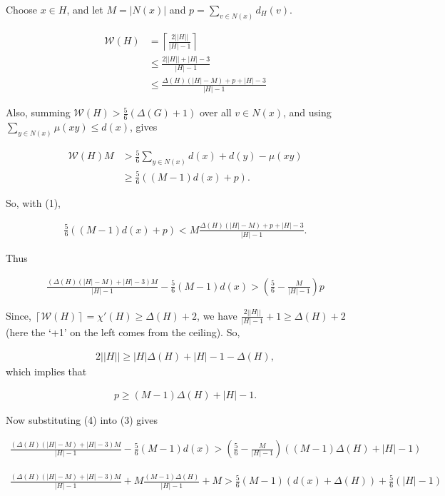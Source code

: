 \documentclass[12pt]{amsart}
\theoremstyle{plain}
\theoremstyle{definition}
\theoremstyle{remark}
\newcommand{\fancy}[1]{\mathcal{#1}}
\newcommand{\W}{\fancy{W}}
\newcommand{\ceil}[1]{\left\lceil#1\right\rceil}
\begin{document}
Choose $x \in H$, and let $M = |N(x)|$ and $p = \sum_{v \in N(x)} d_H(v)$.

\begin{align}
\W(H) & = \ceil{\frac{2||H||}{|H| - 1}} \\
& \le \frac{2||H|| + |H| - 3}{|H|-1}  \nonumber \\
& \le \frac{\Delta(H)(|H| - M) + p + |H| - 3}{|H|-1} \nonumber
\end{align}

Also, summing $\W(H) > \frac56(\Delta(G) + 1)$ over all $v \in N(x)$, and using
$\sum_{y\in N(x)}\mu(xy)\le d(x)$, gives

\begin{align}
\W(H)M & >  \frac56\sum_{y\in N(x)}d(x)+d(y)-\mu(xy) \nonumber \\
& \ge \frac56((M-1)d(x) + p).
\end{align}

So, with (1),

\begin{align*}
 \frac56((M-1)d(x) + p) <  M\frac{\Delta(H)(|H| - M) + p + |H| - 3}{|H|-1}.
\end{align*}

Thus

\begin{align}
\frac{(\Delta(H)(|H| - M) + |H| - 3)M}{|H| - 1} - \frac56(M-1)d(x) > \left(\frac56 -
\frac{M}{|H| - 1}\right)p
\end{align}

Since,
$\ceil{\W(H)} = \chi'(H) \ge \Delta(H) + 2$, we have
$\frac{2||H||}{|H| - 1} + 1 \ge \Delta(H) + 2$ (here the `+1' on the left comes
from the ceiling).
So,

\begin{align*}
2||H|| \ge |H|\Delta(H) + |H| - 1 - \Delta(H),
\end{align*}
which implies that

\begin{align}
p \ge (M-1)\Delta(H) + |H| - 1.
\end{align}

Now substituting (4) into (3) gives

\begin{align*}
\frac{(\Delta(H)(|H| - M) + |H| - 3)M}{|H| - 1} - \frac56(M-1)d(x) > \left(\frac56 -
\frac{M}{|H| - 1}\right)((M-1)\Delta(H) + |H| - 1)
\end{align*}

\begin{align*}
\frac{(\Delta(H)(|H| - M) + |H| - 3)M}{|H| - 1} + M\frac{(M-1)\Delta(H) %
}{|H| - 1}+M > \frac56(M-1)(d(x) + \Delta(H)) + \frac56(|H| - 1)
\end{align*}
\end{document}
